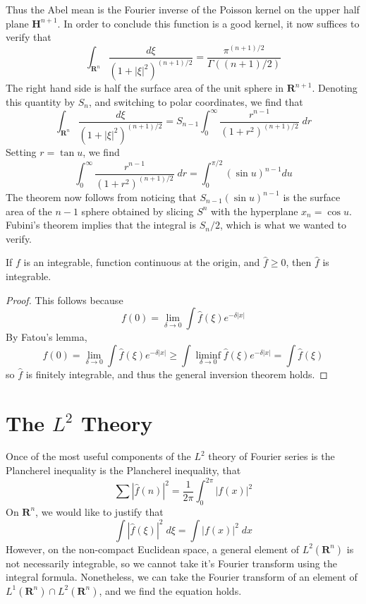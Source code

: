 \begin{example}
	Thus the Abel mean is the Fourier inverse of the Poisson kernel on the upper half plane $\mathbf{H}^{n+1}$. In order to conclude this function is a good kernel, it now suffices to verify that
	\[ \int_{\mathbf{R}^n} \frac{d\xi}{(1 + |\xi|^2)^{(n+1)/2}} = \frac{\pi^{(n+1)/2}}{\Gamma((n+1)/2)} \]
	The right hand side is half the surface area of the unit sphere in $\mathbf{R}^{n+1}$. Denoting this quantity by $S_n$, and switching to polar coordinates, we find that
	\[ \int_{\mathbf{R}^n} \frac{d\xi}{(1 + |\xi|^2)^{(n+1)/2}} = S_{n-1} \int_0^\infty \frac{r^{n-1}}{(1 + r^2)^{(n+1)/2}}\; dr \]
	Setting $r = \tan u$, we find
	\[ \int_0^\infty \frac{r^{n-1}}{(1 + r^2)^{(n+1)/2}}\; dr = \int_0^{\pi/2} (\sin u)^{n-1} du \]
	The theorem now follows from noticing that $S_{n-1} (\sin u)^{n-1}$ is the surface area of the $n-1$ sphere obtained by slicing $S^n$ with the hyperplane $x_n = \cos u$. Fubini's theorem implies that the integral is $S_n/2$, which is what we wanted to verify.
\end{example}

\begin{theorem}
	If $f$ is an integrable, function continuous at the origin, and $\widehat{f} \geq 0$, then $\widehat{f}$ is integrable.
\end{theorem}
\begin{proof}
	This follows because
	\[ f(0) = \lim_{\delta \to 0} \int \widehat{f}(\xi) e^{-\delta |x|} \]
	By Fatou's lemma,
	\[ f(0) = \lim_{\delta \to 0} \int \widehat{f}(\xi) e^{-\delta |x|} \geq \int \liminf_{\delta \to 0} \widehat{f}(\xi) e^{-\delta |x|} = \int \widehat{f}(\xi) \]
	so $\widehat{f}$ is finitely integrable, and thus the general inversion theorem holds.
\end{proof}

\section{The $L^2$ Theory}

Once of the most useful components of the $L^2$ theory of Fourier series is the Plancherel inequality is the Plancherel inequality, that
%
\[ \sum |\widehat{f}(n)|^2 = \frac{1}{2\pi} \int_0^{2\pi} |f(x)|^2 \]
%
On $\mathbf{R}^n$, we would like to justify that
%
\[ \int |\widehat{f}(\xi)|^2\; d\xi = \int |f(x)|^2\; dx \]
%
However, on the non-compact Euclidean space, a general element of $L^2(\mathbf{R}^n)$ is not necessarily integrable, so we cannot take it's Fourier transform using the integral formula. Nonetheless, we can take the Fourier transform of an element of $L^1(\mathbf{R}^n) \cap L^2(\mathbf{R}^n)$, and we find the equation holds.

